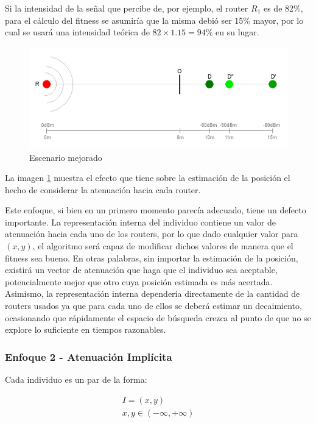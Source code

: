 \documentclass[journal]{IEEEtran}
\begin{document}
Si la intensidad de la señal que percibe de, por ejemplo, el router $R_1$ es de 82\%, para el cálculo del fitness se asumiría que la misma debió ser 15\% mayor, por lo cual se usará una intensidad teórica de $82 \times 1.15 = 94\%$ en su lugar.\\

\begin{figure}[h]
\centering
\includegraphics[width=\linewidth]{improvement.png}
\caption{Escenario mejorado}
\label{fig:improvement}
\end{figure}

La imagen \ref{fig:improvement} muestra el efecto que tiene sobre la estimación de la posición el hecho de considerar la atenuación hacia cada router.

Este enfoque, si bien en un primero momento parecía adecuado, tiene un defecto importante. La representación interna del individuo contiene un valor de atenuación hacia cada uno de los routers, por lo que dado cualquier valor para $(x,y)$, el algoritmo será capaz de modificar dichos valores de manera que el fitness sea bueno. En otras palabras, sin importar la estimación de la posición, existirá un vector de atenuación que haga que el individuo sea aceptable, potencialmente mejor que otro cuya posición estimada es más acertada. Asimismo, la representación interna dependería directamente de la cantidad de routers usados ya que para cada uno de ellos se deberá estimar un decaimiento, ocasionando que rápidamente el espacio de búsqueda crezca al punto de que no se explore lo suficiente en tiempos razonables.\\

\subsubsection{Enfoque 2 - Atenuación Implícita}

Cada individuo es un par de la forma:

\begin{gather*}
I = (x, y)\\
x, y \in (-\infty, +\infty)
\end{gather*}
\end{document}
